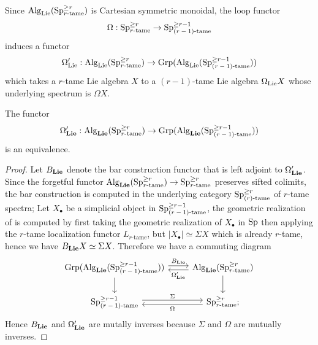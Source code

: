 Since $\operatorname{Alg}_{\operatorname{Lie}}(\operatorname{Sp}^{\geq r}_{\text{$r$-tame}})$ is Cartesian symmetric monoidal, the loop functor 
$$
\Omega: \operatorname{Sp}^{\geq r}_{\text{$r$-tame}}
\to 
\operatorname{Sp}^{\geq r-1}_{\text{$(r-1)$-tame}}
$$
induces a functor
\[
\Omega_{\operatorname{Lie}}':\operatorname{Alg}_{\operatorname{Lie}}(\operatorname{Sp}^{\geq r}_{\text{$r$-tame}}) \to \operatorname{Grp}( \operatorname{Alg}_{\operatorname{Lie}}(\operatorname{Sp}^{\geq r-1}_{\text{$(r-1)$-tame}}) )
\]
which takes a $r$-tame Lie algebra $X$ to a $(r-1)$-tame Lie algebra $\Omega_{\operatorname{Lie}}X$ whose underlying spectrum is $\Omega X$.
\begin{proposition}
	\label{B and Omega are mutally inverses}
	The functor 
	\[
	\Omega_{\mathbf{Lie}}': 
	\operatorname{Alg}_{\mathbf{Lie}}(\operatorname{Sp}^{\geq r}_{\text{$r$-tame}}) \to \operatorname{Grp}( \operatorname{Alg}_{\mathbf{Lie}}(\operatorname{Sp}^{\geq r-1}_{\text{$(r-1)$-tame}}) )
	\]
	is an equivalence.
\end{proposition}
\begin{proof}
	Let $B_{\mathbf{Lie}}$ denote the bar construction functor that is left adjoint to $\Omega_{\mathbf{Lie}}'$. Since the forgetful functor 	
	$\operatorname{Alg}_{\mathbf{Lie}}(\operatorname{Sp}^{\geq r}_{\text{$r$-tame}}) \to \operatorname{Sp}^{\geq r}_{\text{$r$-tame}}$ preserves sifted colimits, the bar construction is computed in the underlying category $\operatorname{Sp}^{\geq r}_{\text{$(r)$-tame}}$ of $r$-tame spectra;
	Let $X_{\bullet}$ be a simplicial object in $\operatorname{Sp}^{\geq r-1}_{\text{$(r-1)$-tame}}$, the geometric realization of is computed by first taking the geometric realization of $X_{\bullet}$ in $\operatorname{Sp}$ then applying the $r$-tame localization functor $L_{\text{$r$-tame}}$, but $|X_{\bullet}|\simeq \Sigma X$ which is already $r$-tame, hence we have $B_{\mathbf{Lie}}X\simeq \Sigma X$.
	Therefore we have a commuting diagram
	\[
	\begin{tikzcd}
		\Grp( \Alg_{\spLie}(\Sp^{\geq r-1}_{\text{$(r-1)$-tame}}) ) & \Alg_{\spLie}(\Sp^{\geq r}_{\text{$r$-tame}})\\
		\Sp^{\geq r-1}_{\text{$(r-1)$-tame}} &
		\Sp^{\geq r}_{\text{$r$-tame}};
		\arrow[from=1-1, to=1-2, "B_{\spLie}", shift left]
		\arrow[from=1-2, to=1-1, "\Omega_{\spLie}'", shift left]
		\arrow[from=1-1, to=2-1]
		\arrow[from=1-2, to=2-2]
		\arrow[from=2-1, to=2-2, "\Sigma", shift left]
		\arrow[from=2-2, to=2-1, "\Omega", shift left]
	\end{tikzcd}
	\]
	Hence $B_{\mathbf{Lie}}$ and $\Omega_{\mathbf{Lie}}'$ are mutally inverses because $\Sigma$ and $\Omega$ are mutually inverses.
\end{proof}

